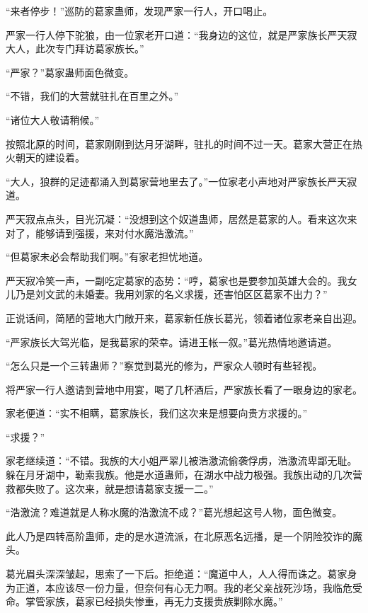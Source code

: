 
\begin{this_body}

“来者停步！”巡防的葛家蛊师，发现严家一行人，开口喝止。

严家一行人停下驼狼，由一位家老开口道：“我身边的这位，就是严家族长严天寂大人，此次专门拜访葛家族长。”

“严家？”葛家蛊师面色微变。

“不错，我们的大营就驻扎在百里之外。”

“诸位大人敬请稍候。”

按照北原的时间，葛家刚刚到达月牙湖畔，驻扎的时间不过一天。葛家大营正在热火朝天的建设着。

“大人，狼群的足迹都涌入到葛家营地里去了。”一位家老小声地对严家族长严天寂道。

严天寂点点头，目光沉凝：“没想到这个奴道蛊师，居然是葛家的人。看来这次来对了，能够请到强援，来对付水魔浩激流。”

“但葛家未必会帮助我们啊。”有家老担忧地道。

严天寂冷笑一声，一副吃定葛家的态势：“哼，葛家也是要参加英雄大会的。我女儿乃是刘文武的未婚妻。我用刘家的名义求援，还害怕区区葛家不出力？”

正说话间，简陋的营地大门敞开来，葛家新任族长葛光，领着诸位家老亲自出迎。

“严家族长大驾光临，是我葛家的荣幸。请进王帐一叙。”葛光热情地邀请道。

“怎么只是一个三转蛊师？”察觉到葛光的修为，严家众人顿时有些轻视。

将严家一行人邀请到营地中用宴，喝了几杯酒后，严家族长看了一眼身边的家老。

家老便道：“实不相瞒，葛家族长，我们这次来是想要向贵方求援的。”

“求援？”

家老继续道：“不错。我族的大小姐严翠儿被浩激流偷袭俘虏，浩激流卑鄙无耻。躲在月牙湖中，勒索我族。他是水道蛊师，在湖水中战力极强。我族出动的几次营救都失败了。这次来，就是想请葛家支援一二。”

“浩激流？难道就是人称水魔的浩激流不成？”葛光想起这号人物，面色微变。

此人乃是四转高阶蛊师，走的是水道流派，在北原恶名远播，是一个阴险狡诈的魔头。

葛光眉头深深皱起，思索了一下后。拒绝道：“魔道中人，人人得而诛之。葛家身为正道，本应该尽一份力量，但奈何有心无力啊。我的老父亲战死沙场，我临危受命。掌管家族，葛家已经损失惨重，再无力支援贵族剿除水魔。”


\end{this_body}
